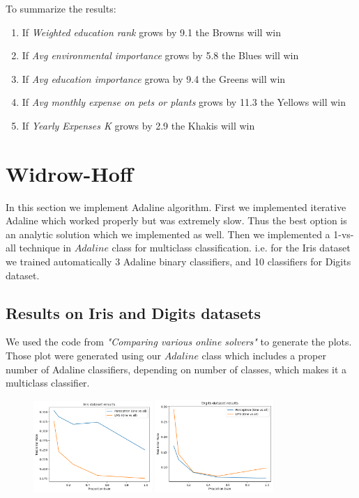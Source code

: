 \documentclass[12pt]{article}
\begin{document}
To summarize the results:

\begin{enumerate}

\item If \textit{Weighted education rank} grows by 9.1 the Browns will win

\item If \textit{Avg environmental importance} grows by 5.8 the Blues will win

\item If \textit{Avg education importance} growa by 9.4 the  Greens will win

\item If \textit{Avg monthly expense on pets or plants} grows by 11.3 the Yellows will win

\item If \textit{Yearly Expenses K} grows by 2.9 the Khakis will win
\end{enumerate}


\section{Widrow-Hoff}
In this section we implement Adaline algorithm. First we implemented iterative Adaline which worked properly but was extremely slow. Thus the best option is an analytic solution which we implemented as well. Then we implemented a 1-vs-all technique in $Adaline$ class for multiclass classification. i.e. for the Iris dataset we trained automatically 3 Adaline binary classifiers, and 10 classifiers for Digits dataset.
\subsection{Results on Iris and Digits datasets}
We used the code from \textit{"Comparing various online solvers"} to generate the plots. Those plot were generated using our $Adaline$ class which includes a proper number of Adaline classifiers, depending on number of classes, which makes it a multiclass classifier. 
\begin{figure}[ht]
	\centering
	\includegraphics[width=0.4\textwidth]{weirdo_hoff_plots/iris}
	\includegraphics[width=0.4\textwidth]{weirdo_hoff_plots/digits}			
\end{figure}
\end{document}
